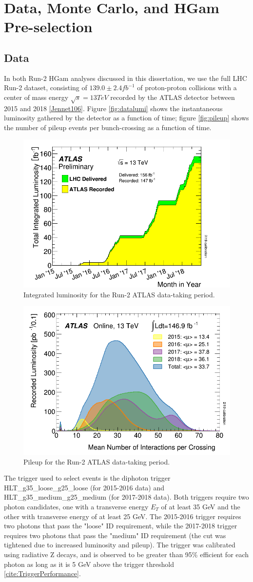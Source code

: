 \section{Data, Monte Carlo, and HGam Pre-selection} \label{sec:DataMC}

\subsection{Data} \label{sec:Data}

In both Run-2 HGam analyses discussed in this dissertation, we use the full LHC Run-2 dataset, consisting of $139.0 \pm 2.4 fb^{-1}$ of proton-proton collisions with a center of mass energy $\sqrt{s} = 13 TeV$ recorded by the ATLAS detector between 2015 and 2018 \ref{Jennet106}. Figure \ref{fig:datalumi} shows the instantaneous luminosity gathered by the detector as a function of time; figure \ref{fig:pileup} shows the number of pileup events per bunch-crossing as a function of time. 

\begin{figure}
\includegraphics[width=0.5\linewidth]{figures/datamc_chapter/datalumi.png}
\caption{Integrated luminosity for the Run-2 ATLAS data-taking period.}
\end{figure}

\begin{figure}
\includegraphics[width=0.5\linewidth]{figures/datamc_chapter/pileup.png}
\caption{Pileup for the Run-2 ATLAS data-taking period.}
\end{figure}

The trigger used to select events is the diphoton trigger HLT\_g35\_loose\_g25\_loose (for 2015-2016 data) and HLT\_g35\_medium\_g25\_medium (for 2017-2018 data). Both triggers require two photon candidates, one with a transverse energy $E_{T}$ of at least 35 GeV and the other with transverse energy of at least 25 GeV. The 2015-2016 trigger requires two photons that pass the "loose" ID requirement, while the 2017-2018 trigger requires two photons that pass the "medium" ID requirement (the cut was tightened due to increased luminosity and pileup). The trigger was calibrated using radiative Z decays, and is observed to be greater than 95\% efficient for each photon as long as it is 5 GeV above the trigger threshold \ref{cite:TriggerPerformance}.

